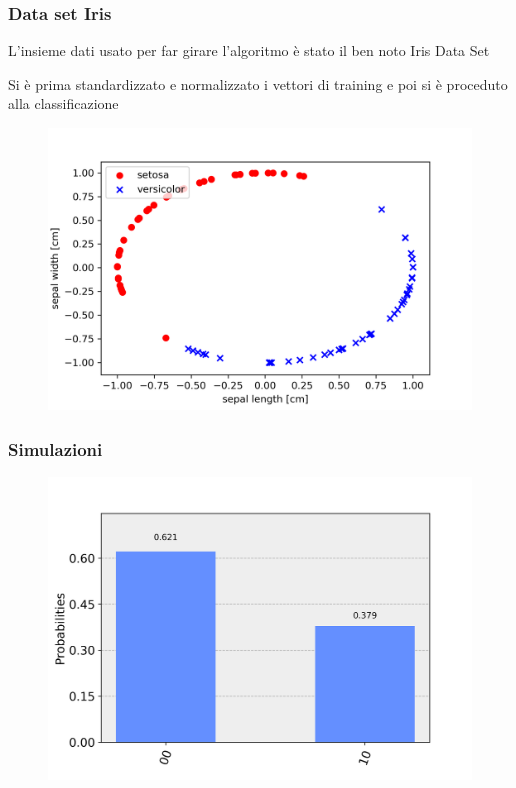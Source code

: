 \documentclass{beamer}
\begin{document}
	\begin{frame}
		\frametitle{Data set Iris}
	
		L'insieme dati usato per far girare l'algoritmo 
		è stato il ben noto Iris Data Set

		Si è prima standardizzato e normalizzato i vettori 
		di training e poi si è proceduto alla classificazione
		
		\begin{figure}[]
			\centering
			\includegraphics[width=.75\textwidth]{gfx/iris/iris2normalized}
			\caption{}
			\label{fig:iris_normalizzato}
		\end{figure}

	\end{frame}

	\begin{frame}
		\frametitle{Simulazioni}
		\begin{figure}[]
			\centering
			\includegraphics[width=\textwidth]{gfx/iris/histogram}
			\caption{}
			\label{fig:setosa_simulazione}
		\end{figure}
	
	\end{frame}
\end{document}
